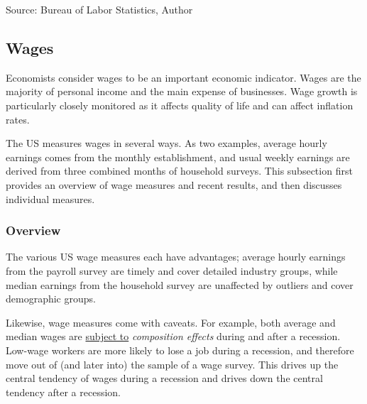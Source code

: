\documentclass{report}
\newcommand{\tbllink}[1]{\href{https://raw.githubusercontent.com/bdecon/US-chartbook/master/chartbook/data/#1}{\faTable}}
\begin{document}
{\begin{minipage}{0.475\textwidth}
\footnotesize{Source: Bureau of Labor Statistics, Author} \hfill \tbllink{selfemp.csv} \ \ 
\end{minipage} \hspace{5mm}
\begin{minipage}{0.24\textwidth}
\small 
\end{minipage}
\newpage
\vspace*{-11mm}

\begin{minipage}{0.76\textwidth}  
\subsection*{Wages} \hypertarget{labw}{\label{labw}}
\small Economists consider wages to be an important economic indicator. Wages are the majority of personal income and the main expense of businesses. Wage growth is particularly closely monitored as it affects quality of life and can affect inflation rates. 

The US measures wages in several ways. As two examples, average hourly earnings comes from the monthly establishment, and usual weekly earnings are derived from three combined months of household surveys. This subsection first provides an overview of wage measures and recent results, and then discusses individual measures. 
\vspace{1mm}

\subsubsection*{Overview}
\vspace*{-1mm}

\small The various US wage measures each have advantages; average hourly earnings from the payroll survey are timely and cover detailed industry groups, while median earnings from the household survey are unaffected by outliers and cover demographic groups. 

Likewise, wage measures come with caveats. For example, both average and median wages are \href{https://www.dallasfed.org/research/economics/2022/0215}{subject to} \textit{composition effects} during and after a recession. Low-wage workers are more likely to lose a job during a recession, and therefore move out of (and later into) the sample of a wage survey. This drives up the central tendency of wages during a recession and drives down the central tendency after a recession. 
\end{minipage}

}
\end{document}
